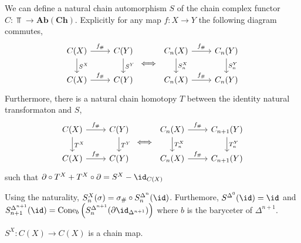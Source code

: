 \documentclass[12pt]{extarticle}
\begin{document}
\begin{proposition}
We can define a natural chain automorphism $S$ of the chain complex functor $C : \Top \to \mathbf{Ab(Ch)}$. Explicitly for any map $f : X \to Y$ the following diagram commutes,
\[
\begin{tikzcd}
C(X) \arrow[r, "f_{\#}"] \arrow[d, "S^X"] & C(Y) \arrow[d, "S^Y"] 
\\
C(X) \arrow[r, "f_{\#}"] & C(Y)
\end{tikzcd}
\iff 
\begin{tikzcd}
C_n(X) \arrow[r, "f_{\#}"] \arrow[d, "S^X_n"] & C_n(Y) \arrow[d, "S^Y_n"] 
\\
C_n(X) \arrow[r, "f_{\#}"] & C_n(Y)
\end{tikzcd}
\]
Furthermore, there is a natural chain homotopy $T$ between the identity natural transformaton and $S$,
\[
\begin{tikzcd}
C(X) \arrow[r, "f_{\#}"] \arrow[d, "T^X"] & C(Y) \arrow[d, "T^Y"] 
\\
C(X) \arrow[r, "f_{\#}"] & C(Y)
\end{tikzcd}
\iff 
\begin{tikzcd}
C_n(X) \arrow[r, "f_{\#}"] \arrow[d, "T^X_n"] & C_{n+1}(Y) \arrow[d, "T^Y_n"] 
\\
C_n(X) \arrow[r, "f_{\#}"] & C_{n+1}(Y)
\end{tikzcd}
\]
such that $\partial \circ T^X + T^X \circ \partial = S^{X} - \id_{C(X)}$
\end{proposition}

\begin{definition}
Using the naturality, $S^X_{n}(\sigma) = \sigma_{\#} \circ S^{\Delta^{n}}_n(\id)$.  Furthemore,
$S^{\Delta^0}(\id) = \id$ and $S^{\Delta^{n+1}}_{n+1}(\id) = \cone_b\left( S^{\Delta^{n+1}}_n(\partial \id_{\Delta^{n+1}}) \right)$
where $b$ is the baryceter of $\Delta^{n+1}$. 
\end{definition}

\begin{lemma}
$S^X : C(X) \to C(X)$ is a chain map.
\end{lemma}
\end{document}
